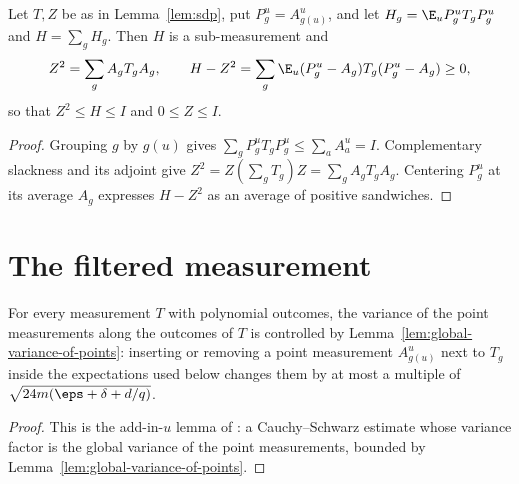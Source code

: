 \begin{lemma}\label{lem:sdp-certificate-contraction}
	\leanok
	Let $T,Z$ be as in Lemma~\ref{lem:sdp}, put $P^u_g=A^u_{g(u)}$, and let
	$H_g=\E_uP^u_gT_gP^u_g$ and $H=\sum_gH_g$.  Then $H$ is a sub-measurement
	and
	\[
		Z^2=\sum_gA_gT_gA_g,\qquad
		H-Z^2=\sum_g\E_u(P^u_g-A_g)T_g(P^u_g-A_g)\ge0,
	\]
	so that $Z^2\le H\le I$ and $0\le Z\le I$.
\end{lemma}
\begin{proof}
	\leanok
	Grouping $g$ by $g(u)$ gives $\sum_gP^u_gT_gP^u_g\le\sum_aA^u_a=I$.
	Complementary slackness and its adjoint give
	$Z^2=Z(\sum_gT_g)Z=\sum_gA_gT_gA_g$.  Centering $P^u_g$ at its average
	$A_g$ expresses $H-Z^2$ as an average of positive sandwiches.
\end{proof}

\section{The filtered measurement}

\begin{lemma}[Add-in-$u$]\label{lem:add-in-u}
	\leanok
	For every measurement $T$ with polynomial outcomes, the variance of the
	point measurements along the outcomes of $T$ is controlled by
	Lemma~\ref{lem:global-variance-of-points}: inserting or removing a point
	measurement $A^u_{g(u)}$ next to $T_g$ inside the expectations used below
	changes them by at most a multiple of
	$\sqrt{24m(\eps+\delta+d/q)}$.
\end{lemma}
\begin{proof}
	\leanok
	This is the add-in-$u$ lemma of \cite{Ji2020LowIndividualDegree}: a
	Cauchy--Schwarz estimate whose variance factor is the global variance of
	the point measurements, bounded by Lemma~\ref{lem:global-variance-of-points}.
\end{proof}

